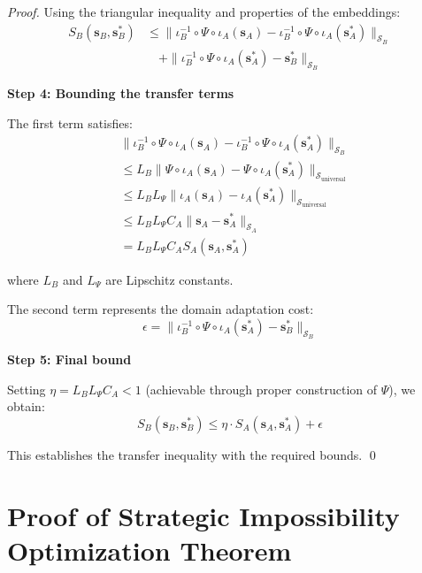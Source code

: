 \documentclass[12pt,a4paper]{article}
\begin{document}
\begin{proof}
Using the triangular inequality and properties of the embeddings:
\begin{align}
S_B(\mathbf{s}_B, \mathbf{s}_B^*) &\leq \|\iota_B^{-1} \circ \Psi \circ \iota_A(\mathbf{s}_A) - \iota_B^{-1} \circ \Psi \circ \iota_A(\mathbf{s}_A^*)\|_{\mathcal{S}_B}\\
&\quad + \|\iota_B^{-1} \circ \Psi \circ \iota_A(\mathbf{s}_A^*) - \mathbf{s}_B^*\|_{\mathcal{S}_B}
\end{align}

\textbf{Step 4: Bounding the transfer terms}

The first term satisfies:
\begin{align}
&\|\iota_B^{-1} \circ \Psi \circ \iota_A(\mathbf{s}_A) - \iota_B^{-1} \circ \Psi \circ \iota_A(\mathbf{s}_A^*)\|_{\mathcal{S}_B}\\
&\leq L_B \|\Psi \circ \iota_A(\mathbf{s}_A) - \Psi \circ \iota_A(\mathbf{s}_A^*)\|_{\mathcal{S}_{\text{universal}}}\\
&\leq L_B L_{\Psi} \|\iota_A(\mathbf{s}_A) - \iota_A(\mathbf{s}_A^*)\|_{\mathcal{S}_{\text{universal}}}\\
&\leq L_B L_{\Psi} C_A \|\mathbf{s}_A - \mathbf{s}_A^*\|_{\mathcal{S}_A}\\
&= L_B L_{\Psi} C_A S_A(\mathbf{s}_A, \mathbf{s}_A^*)
\end{align}

where $L_B$ and $L_{\Psi}$ are Lipschitz constants.

The second term represents the domain adaptation cost:
\begin{equation}
\epsilon = \|\iota_B^{-1} \circ \Psi \circ \iota_A(\mathbf{s}_A^*) - \mathbf{s}_B^*\|_{\mathcal{S}_B}
\end{equation}

\textbf{Step 5: Final bound}

Setting $\eta = L_B L_{\Psi} C_A < 1$ (achievable through proper construction of $\Psi$), we obtain:
\begin{equation}
S_B(\mathbf{s}_B, \mathbf{s}_B^*) \leq \eta \cdot S_A(\mathbf{s}_A, \mathbf{s}_A^*) + \epsilon
\end{equation}

This establishes the transfer inequality with the required bounds. \qed
\end{proof}

\section{Proof of Strategic Impossibility Optimization Theorem}
\label{proof:strategic_impossibility}
\end{document}
